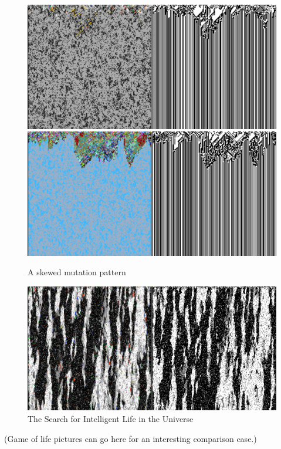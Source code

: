 \documentclass{AISB2008}
\begin{document}
\begin{figure}
\includegraphics[width=\columnwidth]{eoc.png} \newline
\includegraphics[width=\columnwidth]{reef.png}
\caption{A skewed mutation pattern}
\end{figure}

\begin{figure}
\includegraphics[width=\columnwidth]{seti.png}
\caption{The Search for Intelligent Life in the Universe}
\end{figure}
\clearpage
(Game of life pictures can go here for an interesting comparison
case.)
\newpage
\end{document}
